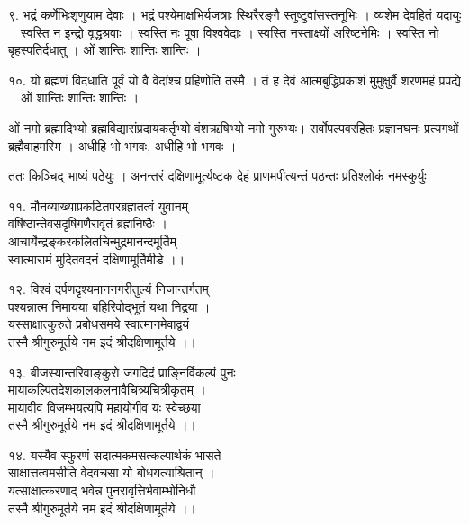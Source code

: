 ९. भद्रं कर्णेभिःशृणुयाम देवाः । भद्रं पश्येमाक्षभिर्यजत्राः स्थिरैरङ्गै स्तुष्टुवांसस्तनूभिः । व्यशेम देवहितं यदायुः । स्वस्ति न इन्द्रो वृद्धश्रवाः । स्वस्ति नः पूषा विश्ववेदाः । स्वस्ति नस्ताक्ष्यों अरिष्टनेमिः । स्वस्ति नो बृहस्पतिर्दधातु । ओं शान्तिः शान्तिः शान्तिः ।

१०. यो ब्रह्मणं विदधाति पूर्वं यो वै वेदांश्च प्रहिणोति तस्मै । तं ह देवं आत्मबुद्धिप्रकाशं मुमुक्षुर्वै शरणमहं प्रपद्ये । ओं शान्तिः शान्तिः शान्तिः । 

ओं नमो ब्रह्मादिभ्यो ब्रह्मविद्यासंप्रदायकर्तृभ्यो वंशऋषिभ्यो नमो गुरुभ्यः। सर्वोपल्पवरहितः प्रज्ञानघनः प्रत्यगथों ब्रह्मैवाहमस्मि । अधीहि भो भगवः, अधीहि भो भगवः । 

ततः किञ्चिद् भाष्यं पठेयुः ।
अनन्तरं दक्षिणामूर्त्यष्टक देहं प्राणमपीत्यन्तं पठन्तः प्रतिश्लोकं नमस्कुर्युः 

११. मौनव्याख्याप्रकटितपरब्रह्मतत्वं युवानम् \\
वषिंष्ठान्तेवसदृषिगणैरावृतं ब्रह्मनिष्ठैः ।\\
आचार्येन्द्रङ्करकलितचिन्मुद्रमानन्दमूर्तिम् \\
स्वात्मारामं मुदितवदनं दक्षिणामूर्तिमीडे ।। 

१२. विश्वं दर्पणदृश्यमाननगरीतुल्यं निजान्तर्गतम् \\
पश्यन्नात्म निमायया बहिरिवोद्भूतं यथा निद्रया ।\\
यस्साक्षात्कुरुते प्रबोधसमये स्वात्मानमेवाद्वयं \\
तस्मै श्रीगुरुमूर्तये नम इदं श्रीदक्षिणामूर्तये ।। 

१३. बीजस्यान्तरिवाङ्कुरो जगदिदं प्राङ्निर्विकल्पं पुनः \\
मायाकल्पितदेशकालकलनावैचित्र्यचित्रीकृतम् ।\\
मायावीव विजम्भयत्यपि महायोगीव यः स्वेच्छया \\
तस्मै श्रीगुरुमूर्तये नम इदं श्रीदक्षिणामूर्तये ।। 

१४. यस्यैव स्फुरणं सदात्मकमसत्कल्पार्थकं भासते \\
साक्षात्तत्वमसीति वेदवचसा यो बोधयत्याश्रितान् ।\\
यत्साक्षात्करणाद् भवेन्न पुनरावृत्तिर्भवाम्भोनिधौ \\
तस्मै श्रीगुरुमूर्तये नम इदं श्रीदक्षिणामूर्तये ।। 

